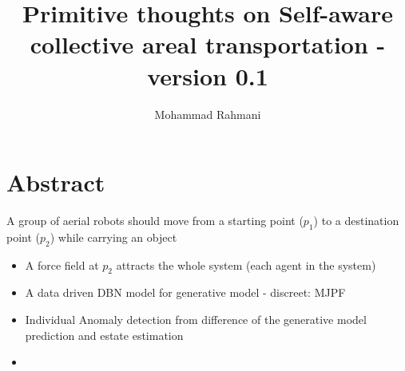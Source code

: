\documentclass{article}
\begin{document}
	
	\title{Primitive thoughts on Self-aware collective areal transportation - version 0.1}
	\author{Mohammad Rahmani}
	\date{}
	\maketitle
	\section{Abstract}
	A group of aerial robots should move from a starting point ($p_1$) to a destination point ($p_2$) while carrying an object
	\begin{itemize}
		\item A force field at $p_2$ attracts the whole system (each agent in the system) \cite{campo-2017-static-force-field-representation-of-environments-based-on-agents-nonlinear-motions}
		\item A data driven DBN model for generative model - discreet: MJPF
		\item Individual Anomaly detection from difference of the generative model prediction and estate estimation
		\item 
	\end{itemize}
	
	
\end{document}
